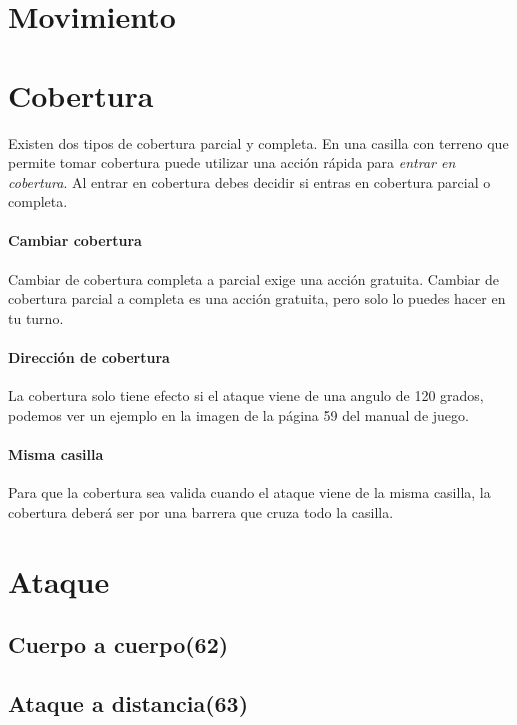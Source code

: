 \section{Movimiento}


\section{Cobertura}
    Existen dos tipos de cobertura parcial y completa. En una casilla con terreno que permite tomar cobertura puede utilizar una acción rápida para \emph{entrar en cobertura}. Al entrar en cobertura debes decidir si entras en cobertura parcial o completa.

    \paragraph{Cambiar cobertura}
    Cambiar de cobertura completa a parcial exige una acción gratuita. Cambiar de cobertura parcial a completa es una acción gratuita, pero solo lo puedes hacer en tu turno.

    \paragraph{Dirección de cobertura}
    La cobertura solo tiene efecto si el ataque viene de una angulo de 120 grados, podemos ver un ejemplo en la imagen de la página 59 del manual de juego.

    \paragraph{Misma casilla}
    Para que la cobertura sea valida cuando el ataque viene de la misma casilla, la cobertura deberá ser por una barrera que cruza todo la casilla.

\section{Ataque}

    \subsection{Cuerpo a cuerpo(62)}
    

    \subsection{Ataque a distancia(63)}
           

